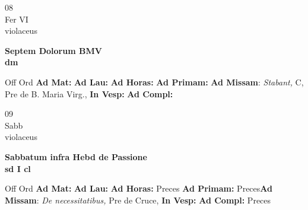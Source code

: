 \documentclass[10pt, openany]{book}
\begin{document}
    \begin{center}
        \begin{minipage}{3.5in}
            \vspace{2em}
            \begin{minipage}{0.5in}
                {\Huge 08} \\
                {\normalsize Fer VI} \\
                {\normalsize violaceus}
            \end{minipage}
            \begin{minipage}{3.0in}
                \textbf{ \large Septem Dolorum BMV \\
                \textnormal{\normalsize dm}} \\ 
            \end{minipage}
            \begin{justify}Off Ord
                \textbf{Ad Mat: }
                \textbf{Ad Lau: }
                \textbf{Ad Horas: }
                \textbf{Ad Primam: }\textbf{Ad Missam}: \textit{Stabant,} C, Pre de B. Maria Virg.,  
                \textbf{In Vesp: }
                \textbf{Ad Compl: }
            \end{justify}
        \end{minipage}
    \end{center}

    \begin{center}
        \begin{minipage}{3.5in}
            \vspace{2em}
            \begin{minipage}{0.5in}
                {\Huge 09} \\
                {\normalsize Sabb} \\
                {\normalsize violaceus}
            \end{minipage}
            \begin{minipage}{3.0in}
                \textbf{ \large Sabbatum infra Hebd de Passione \\
                \textnormal{\normalsize sd I cl}} \\ 
            \end{minipage}
            \begin{justify}Off Ord
                \textbf{Ad Mat: }
                \textbf{Ad Lau: }
                \textbf{Ad Horas: }Preces
                \textbf{Ad Primam: }Preces\textbf{Ad Missam}: \textit{De necessitatibus,} Pre de Cruce,  
                \textbf{In Vesp: }
                \textbf{Ad Compl: }Preces
            \end{justify}
        \end{minipage}
    \end{center}
\end{document}
